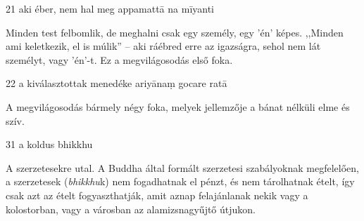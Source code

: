 
\begin{notesdescription}

\item[{21}
{aki éber, nem hal meg}
{appamattā na mīyanti}] \hfill\par

Minden test felbomlik, de meghalni csak egy személy, egy 'én' képes. ,,Minden ami keletkezik, el is múlik'' -- aki ráébred erre az igazságra, sehol nem lát személyt, vagy 'én'-t. Ez a megvilágosodás első foka.

\item[{22}
{a kiválasztottak menedéke}
{ariyānaṃ gocare ratā}] \hfill\par

A megvilágosodás bármely négy foka, melyek jellemzője a bánat nélküli elme és szív.

\item[{31}
{a koldus}
{bhikkhu}] \hfill\par

A szerzetesekre utal. A Buddha által formált szerzetesi szabályoknak megfelelően, a szerzetesek (\textit{bhikkhu}k) nem fogadhatnak el pénzt, és nem tárolhatnak ételt, így csak azt az ételt fogyaszthatják, amit aznap felajánlanak nekik vagy a kolostorban, vagy a városban az alamizsnagyűjtő útjukon.

\end{notesdescription}
